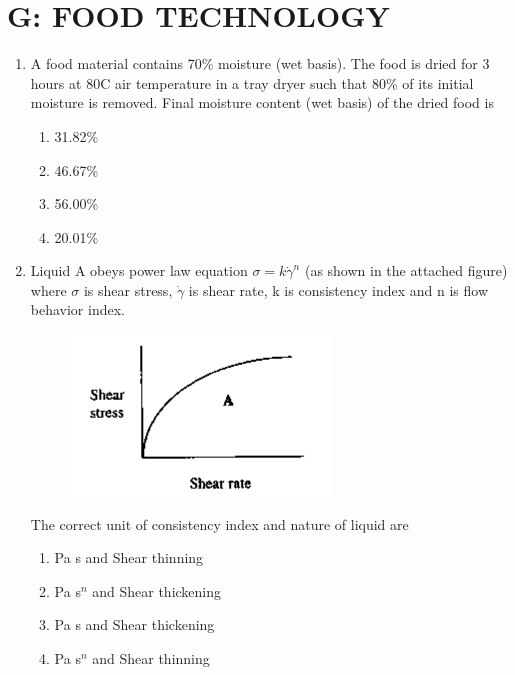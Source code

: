 \documentclass[a4paper,10pt]{article}
\begin{document}
\section*{G: FOOD TECHNOLOGY}
\begin{enumerate}
\item A food material contains 70\% moisture (wet basis). The food is dried for 3 hours at 80\degree C air temperature in a tray dryer such that 80\% of its initial moisture is removed. Final moisture content (wet basis) of the dried food is
\hfill{}

\begin{multicols}{4}
\begin{enumerate}
\item 31.82\%
\item 46.67\%
\item 56.00\%
\item 20.01\%
\end{enumerate}
\end{multicols}

\item Liquid A obeys power law equation $\sigma = k\dot{\gamma}^n$ (as shown in the attached figure) where $\sigma$ is shear stress, $\dot{\gamma}$ is shear rate, k is consistency index and n is flow behavior index.
\begin{figure}[H]
    \centering
    \includegraphics[width=0.4\columnwidth]{Gq2.png}
    \caption*{}
    \label{fig:q2_food}
\end{figure}
The correct unit of consistency index and nature of liquid are
\hfill{}

\begin{multicols}{2}
\begin{enumerate}
\item Pa s and Shear thinning
\item Pa s$^n$ and Shear thickening
\item Pa s and Shear thickening
\item Pa s$^n$ and Shear thinning
\end{enumerate}
\end{multicols}


\end{enumerate}
\end{document}
